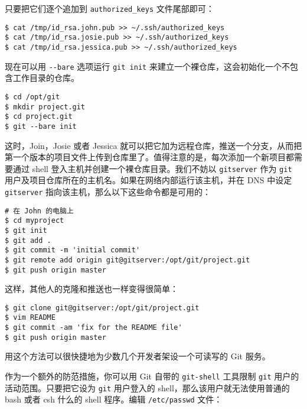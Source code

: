 \documentclass[a4paper]{book}
\begin{document}
只要把它们逐个追加到 \texttt{authorized\_keys} 文件尾部即可：

\begin{shaded}\begin{verbatim}
$ cat /tmp/id_rsa.john.pub >> ~/.ssh/authorized_keys
$ cat /tmp/id_rsa.josie.pub >> ~/.ssh/authorized_keys
$ cat /tmp/id_rsa.jessica.pub >> ~/.ssh/authorized_keys
\end{verbatim}\end{shaded}

现在可以用 \texttt{-{}-bare} 选项运行 \texttt{git init} 来建立一个裸仓库，这会初始化一个不包含工作目录的仓库。

\begin{shaded}\begin{verbatim}
$ cd /opt/git
$ mkdir project.git
$ cd project.git
$ git --bare init
\end{verbatim}\end{shaded}

这时，Join，Josie 或者 Jessica 就可以把它加为远程仓库，推送一个分支，从而把第一个版本的项目文件上传到仓库里了。值得注意的是，每次添加一个新项目都需要通过 shell 登入主机并创建一个裸仓库目录。我们不妨以 \texttt{gitserver} 作为 \texttt{git} 用户及项目仓库所在的主机名。如果在网络内部运行该主机，并在 DNS 中设定 \texttt{gitserver} 指向该主机，那么以下这些命令都是可用的：

\begin{shaded}\begin{verbatim}
# 在 John 的电脑上
$ cd myproject
$ git init
$ git add .
$ git commit -m 'initial commit'
$ git remote add origin git@gitserver:/opt/git/project.git
$ git push origin master
\end{verbatim}\end{shaded}

这样，其他人的克隆和推送也一样变得很简单：

\begin{shaded}\begin{verbatim}
$ git clone git@gitserver:/opt/git/project.git
$ vim README
$ git commit -am 'fix for the README file'
$ git push origin master
\end{verbatim}\end{shaded}

用这个方法可以很快捷地为少数几个开发者架设一个可读写的 Git 服务。

作为一个额外的防范措施，你可以用 Git 自带的 \texttt{git-shell} 工具限制 \texttt{git} 用户的活动范围。只要把它设为 \texttt{git} 用户登入的 shell，那么该用户就无法使用普通的 bash 或者 csh 什么的 shell 程序。编辑 \texttt{/etc/passwd} 文件：
\end{document}
